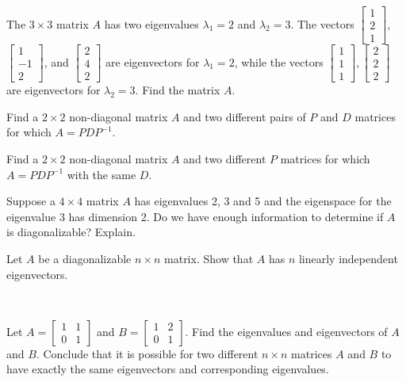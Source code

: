 \item The $3\times 3$ matrix $A$ has two eigenvalues $\lambda_1=2$ and $\lambda_2=3$. The vectors $\left[ \begin{array}{c} 1\\2\\1 \end{array} \right]$, $\left[ \begin{array}{r} 1\\-1\\2 \end{array} \right]$, and $\left[ \begin{array}{c} 2\\4\\2\end{array} \right]$ are eigenvectors for $\lambda_1=2$, while the vectors $\left[ \begin{array}{c} 1\\1\\1\end{array} \right], \left[ \begin{array}{c} 2\\2\\2\end{array} \right]$ are eigenvectors for $\lambda_2=3$. Find the matrix $A$.

\item Find a $2\times 2$ non-diagonal matrix $A$ and two different pairs of $P$ and $D$ matrices for which $A=PDP^{-1}$.

\item Find a $2\times 2$ non-diagonal matrix $A$ and two different $P$ matrices for which $A=PDP^{-1}$ with the same $D$.

\item Suppose a $4\times 4$ matrix $A$ has eigenvalues 2, 3 and 5 and the eigenspace for the eigenvalue 3 has dimension 2. Do we have enough information to determine if $A$ is diagonalizable? Explain.

\item \label{ex:4_c_diagonal_converse} Let $A$ be a diagonalizable $n \times n$ matrix. Show that $A$ has $n$ linearly independent eigenvectors. 

\item ~
	\ba
	\item Let $A = \left[ \begin{array}{cc} 1&1\\0&1 \end{array} \right]$ and $B = \left[ \begin{array}{cc} 1&2\\0&1 \end{array} \right]$. Find the eigenvalues and eigenvectors of $A$ and $B$. Conclude that it is possible for two different $n \times n$ matrices $A$ and $B$ to have exactly the same eigenvectors and corresponding eigenvalues. 


